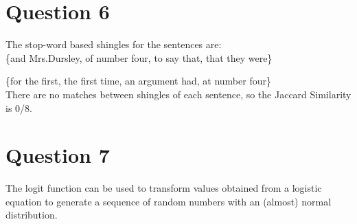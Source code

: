 \documentclass{article}
\begin{document}
\section{Question 6}
The stop-word based shingles for the sentences are:\\

\{and Mrs.Dursley, of number four, to say that, that they were\}\vspace{2mm}

\{for the first, the first time, an argument had, at number four\}\\

\noindent There are no matches between shingles of each sentence, so the Jaccard Similarity is 0/8.

\section{Question 7}

The logit function can be used to transform values obtained from a logistic equation to generate a sequence of random numbers with an (almost) normal distribution.
\end{document}
